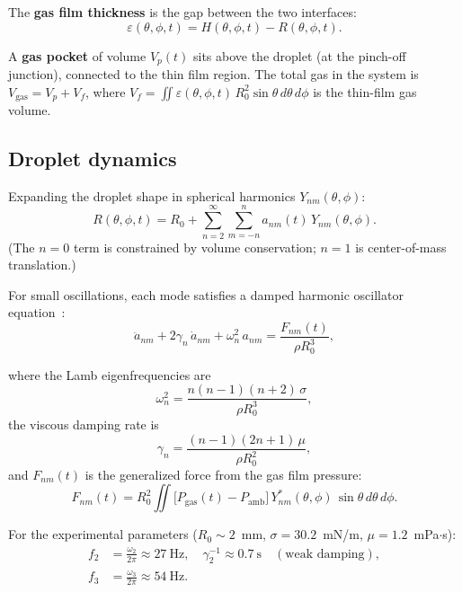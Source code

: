 \documentclass[%
 preprint,
 superscriptaddress,
 amsmath,amssymb,
 aps, prl,
]{revtex4-2}
\begin{document}
The \textbf{gas film thickness} is the gap between the two interfaces:
\begin{equation}
\varepsilon(\theta, \phi, t) = H(\theta, \phi, t) - R(\theta, \phi, t).
\end{equation}

A \textbf{gas pocket} of volume $V_p(t)$ sits above the droplet
(at the pinch-off junction), connected to the thin film region.
The total gas in the system is $V_{\text{gas}} = V_p + V_f$,
where $V_f = \iint \varepsilon(\theta,\phi,t)\,R_0^2\sin\theta\,d\theta\,d\phi$
is the thin-film gas volume.

\subsection{Droplet dynamics}

Expanding the droplet shape in spherical harmonics
$Y_{nm}(\theta,\phi)$:
\begin{equation}
R(\theta,\phi,t) = R_0 + \sum_{n=2}^{\infty}\sum_{m=-n}^{n}
a_{nm}(t)\,Y_{nm}(\theta,\phi).
\end{equation}
(The $n=0$ term is constrained by volume conservation; $n=1$ is
center-of-mass translation.)

For small oscillations, each mode satisfies a damped harmonic oscillator
equation~\cite{Lamb1881,Prosperetti1980}:
\begin{equation}
\ddot{a}_{nm} + 2\gamma_n\,\dot{a}_{nm} + \omega_n^2\,a_{nm}
= \frac{F_{nm}(t)}{\rho R_0^3},
\label{eq:lamb_forced}
\end{equation}

where the Lamb eigenfrequencies are
\begin{equation}
\omega_n^2 = \frac{n(n-1)(n+2)\,\sigma}{\rho R_0^3},
\end{equation}
the viscous damping rate is
\begin{equation}
\gamma_n = \frac{(n-1)(2n+1)\,\mu}{\rho R_0^2},
\end{equation}
and $F_{nm}(t)$ is the generalized force from the gas film pressure:
\begin{equation}
F_{nm}(t) = R_0^2 \iint \bigl[P_{\text{gas}}(t) - P_{\text{amb}}\bigr]\,
Y_{nm}^*(\theta,\phi)\,\sin\theta\,d\theta\,d\phi.
\end{equation}

For the experimental parameters ($R_0 \sim 2$~mm,
$\sigma = 30.2$~mN/m, $\mu = 1.2$~mPa$\cdot$s):
\begin{align}
f_2 &= \frac{\omega_2}{2\pi} \approx 27~\text{Hz}, \quad
\gamma_2^{-1} \approx 0.7~\text{s} \quad (\text{weak damping}), \\
f_3 &= \frac{\omega_3}{2\pi} \approx 54~\text{Hz}.
\end{align}
\end{document}
